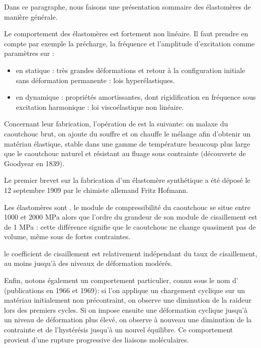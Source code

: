 Dans ce paragraphe, nous faisons une présentation sommaire des élastomères de manière
générale.

\medskip
Le comportement des élastomères est fortement non linéaire.
Il faut prendre en compte par exemple la précharge, la fréquence et l'amplitude
d'excitation comme paramètres sur :
\begin{itemize}
	\item en statique : très grandes déformations et retour à la configuration
		initiale sans déformation permanente : lois hyperélastiques.
	\item en dynamique : propriétés amortissantes, dont rigidification en fréquence
		sous excitation harmonique : loi viscoélastique non linéaire.
\end{itemize}

\medskip
Concernant leur fabrication, l'opération de  est la suivante: 
on malaxe du caoutchouc brut, on ajoute du souffre et on chauffe le
mélange afin d'obtenir un matériau élastique, stable dans une gamme de température
beaucoup plus large que le caoutchouc naturel et résistant au fluage sous contrainte 
(découverte de Goodyear en 1839).

Le premier brevet sur la fabrication d'un élastomère synthétique a été déposé le 12 septembre 
1909 par le chimiste allemand Fritz Hofmann.

\medskip
Les élastomères sont .
le module de compressibilité du caoutchouc se situe entre 1000 et 2000 MPa alors
que l'ordre du grandeur de son module de cisaillement est de 1 MPa : cette différence
signifie que le caoutchouc ne change quasiment pas de volume, même sous de
fortes contraintes.

\medskip
{}
le coefficient de cisaillement est relativement indépendant du taux de cisaillement, au moins
jusqu'à des niveaux de déformation modérés.

\medskip
Enfin, notons également un comportement particulier, connu sous le nom d' (publications en 1966 et 1969):
si l'on applique un chargement cyclique sur un matériau initialement non précontraint,
on observe une diminution de la raideur lors des premiers cycles. Si on impose ensuite une
déformation cyclique jusqu'à un niveau de déformation plus élevé, on observe
à nouveau une diminution de la contrainte et de l'hystérésis jusqu'à un
nouvel équilibre. Ce comportement provient d'une rupture progressive des
liaisons moléculaires.


